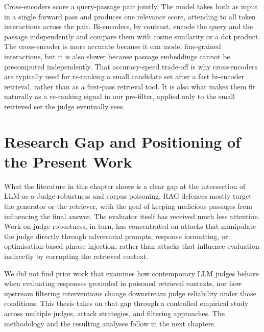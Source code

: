 Cross-encoders score a query-passage pair jointly. The model takes both as input in a single forward pass and produces one relevance score, attending to all token interactions across the pair. Bi-encoders, by contrast, encode the query and the passage independently and compare them with cosine similarity or a dot product. The cross-encoder is more accurate because it can model fine-grained interactions, but it is also slower because passage embeddings cannot be precomputed independently. That accuracy-speed trade-off is why cross-encoders are typically used for re-ranking a small candidate set after a fast bi-encoder retrieval, rather than as a first-pass retrieval tool. It is also what makes them fit naturally as a re-ranking signal in our pre-filter, applied only to the small retrieved set the judge eventually sees.

\section{Research Gap and Positioning of the Present Work}

What the literature in this chapter shows is a clear gap at the intersection of LLM-as-a-Judge robustness and corpus poisoning. RAG defences mostly target the generator or the retriever, with the goal of keeping malicious passages from influencing the final answer. The evaluator itself has received much less attention. Work on judge robustness, in turn, has concentrated on attacks that manipulate the judge directly through adversarial prompts, response formatting, or optimisation-based phrase injection, rather than attacks that influence evaluation indirectly by corrupting the retrieved context.

We did not find prior work that examines how contemporary LLM judges behave when evaluating responses grounded in poisoned retrieval contexts, nor how upstream filtering interventions change downstream judge reliability under those conditions. This thesis takes on that gap through a controlled empirical study across multiple judges, attack strategies, and filtering approaches. The methodology and the resulting analyses follow in the next chapters.

